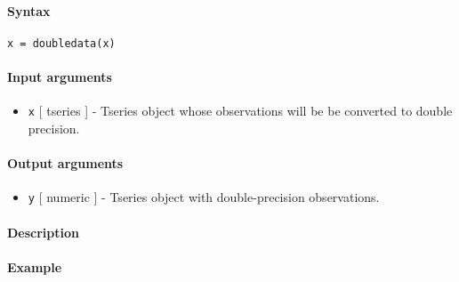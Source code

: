 


	\paragraph{Syntax}

\begin{verbatim}
x = doubledata(x)
\end{verbatim}

\paragraph{Input arguments}

\begin{itemize}
\itemsep1pt\parskip0pt
\item
  \texttt{x} {[} tseries {]} - Tseries object whose observations will be
  be converted to double precision.
\end{itemize}

\paragraph{Output arguments}

\begin{itemize}
\itemsep1pt\parskip0pt
\item
  \texttt{y} {[} numeric {]} - Tseries object with double-precision
  observations.
\end{itemize}

\paragraph{Description}

\paragraph{Example}


